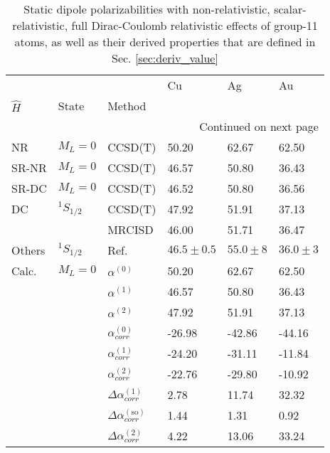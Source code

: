 \begin{longtable}{llllll}
\caption{Static dipole polarizabilities with non-relativistic, scalar-relativistic, full Dirac-Coulomb relativistic effects of group-11 atoms, as well as their derived properties that are defined in Sec. \ref{sec:deriv_value}}\label{tab:dipole_group_11}\\
\toprule
      &         &                                    &            Cu &          Ag &          Au \\
$\hat{H}$ & State & Method &               &             &             \\
\midrule
\endhead
\midrule
\multicolumn{6}{r}{{Continued on next page}} \\
\midrule
\endfoot

\bottomrule
\endlastfoot
NR & $M_L=0$ & CCSD(T) &         50.20 &       62.67 &       62.50 \\
SR-NR & $M_L=0$ & CCSD(T) &         46.57 &       50.80 &       36.43 \\
SR-DC & $M_L=0$ & CCSD(T) &         46.52 &       50.80 &       36.56 \\
DC & $^1S_{1/2}$ & CCSD(T) &         47.92 &       51.91 &       37.13 \\
      &         & MRCISD &         46.00 &       51.71 &       36.47 \\
Others & $^1S_{1/2}$ & Ref. \cite{Schwerdtfeger2019} &  $46.5\pm0.5$ &  $55.0\pm8$ &  $36.0\pm3$ \\
Calc. & $M_L=0$ & $\alpha^{(0)}$ &         50.20 &       62.67 &       62.50 \\
      &         & $\alpha^{(1)}$ &         46.57 &       50.80 &       36.43 \\
      &         & $\alpha^{(2)}$ &         47.92 &       51.91 &       37.13 \\
      &         & $\alpha_{corr}^{(0)}$ &        -26.98 &      -42.86 &      -44.16 \\
      &         & $\alpha_{corr}^{(1)}$ &        -24.20 &      -31.11 &      -11.84 \\
      &         & $\alpha_{corr}^{(2)}$ &        -22.76 &      -29.80 &      -10.92 \\
      &         & $\Delta \alpha_{corr}^{(\text{1})}$ &          2.78 &       11.74 &       32.32 \\
      &         & $\Delta \alpha_{corr}^{(\text{so})}$ &          1.44 &        1.31 &        0.92 \\
      &         & $\Delta \alpha_{corr}^{(\text{2})}$ &          4.22 &       13.06 &       33.24 \\

\end{longtable}
